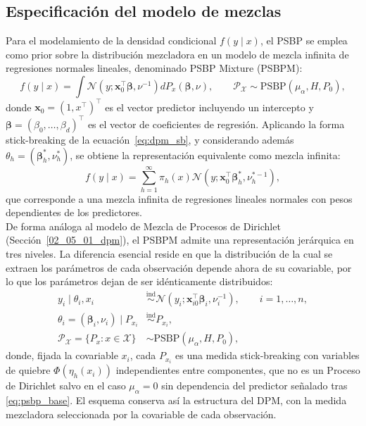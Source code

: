\subsection{Especificación del modelo de mezclas}
\label{03_03_01_especificacion_modelo_mezclas}
Para el modelamiento de la densidad condicional $f(y \mid x)$, el PSBP se emplea como prior sobre la distribución mezcladora en un modelo de mezcla infinita de regresiones normales lineales, denominado PSBP Mixture (PSBPM):
\begin{equation}\label{eq:psbpm}
    f(y \mid x) = \int \mathcal{N}(y; \mathbf{x}_0^\top \boldsymbol{\beta},
    \nu^{-1}) dP_x(\boldsymbol{\beta}, \nu),
    \qquad
    \mathcal{P}_{\mathcal{X}} \sim \mathrm{PSBP}(\mu_\alpha, H, P_0),
\end{equation}
donde $\mathbf{x}_0 = (1, x^\top)^\top$ es el vector predictor incluyendo un intercepto y $\boldsymbol{\beta} = (\beta_0, \dots, \beta_d)^\top$ es el vector de coeficientes de regresión. Aplicando la forma stick-breaking de la ecuación~\eqref{eq:dpm_sb}, y considerando además $\theta_h = (\boldsymbol{\beta}_h^*, \nu_h^*)$, se obtiene la representación equivalente como mezcla infinita:
\begin{equation}\label{eq:psbpm_mezcla}
    f(y \mid x) = \sum_{h=1}^{\infty}
    \pi_h(x) \mathcal{N}\!\left(y; \mathbf{x}_0^\top
    \boldsymbol{\beta}_h^*, \nu_h^{*-1}\right),
\end{equation}
que corresponde a una mezcla infinita de regresiones lineales normales con pesos dependientes de los predictores.\\
 
De forma análoga al modelo de Mezcla de Procesos de Dirichlet (Sección~\ref{02_05_01_dpm}), el PSBPM admite una representación jerárquica en tres niveles. La diferencia esencial reside en que la distribución de la cual se extraen los parámetros de cada observación depende ahora de su covariable, por lo que los parámetros dejan de ser idénticamente distribuidos:
\begin{equation}\label{eq:psbpm_jerarquico}
\begin{aligned}
    y_i \mid \theta_i, x_i &\overset{\mathrm{ind}}{\sim}
    \mathcal{N}\!\left(y_i; \mathbf{x}_{i0}^\top \boldsymbol{\beta}_i,
    \nu_i^{-1}\right),
    \qquad i = 1, \dots, n, \\
    \theta_i = (\boldsymbol{\beta}_i, \nu_i) \mid P_{x_i}
    &\overset{\mathrm{ind}}{\sim} P_{x_i}, \\
    \mathcal{P}_{\mathcal{X}} = \{P_x : x \in \mathcal{X}\}
    &\sim \mathrm{PSBP}(\mu_\alpha, H, P_0),
\end{aligned}
\end{equation}
donde, fijada la covariable $x_i$, cada $P_{x_i}$ es una medida stick-breaking con variables de quiebre $\Phi(\eta_h(x_i))$ independientes entre componentes, que no es un Proceso de Dirichlet salvo en el caso $\mu_\alpha = 0$ sin dependencia del predictor señalado tras \eqref{eq:psbp_base}. El esquema conserva así la estructura del DPM, con la medida mezcladora seleccionada por la covariable de cada observación.\\
 
